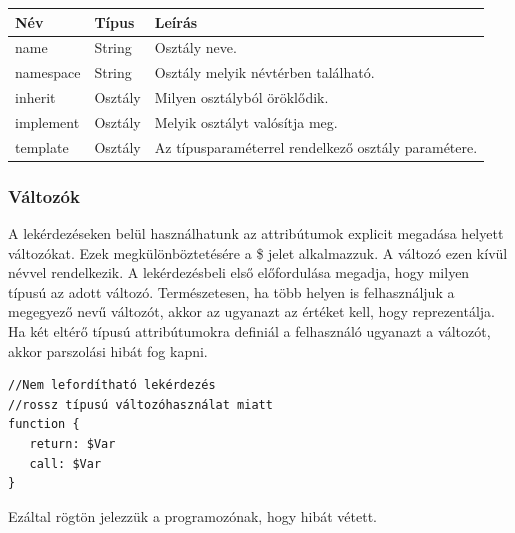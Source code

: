 \documentclass[a4paper,12pt]{report}
\begin{document}
\begin{center}
	\begin{tabular}{| l | l | l |}
		\hline
		Név & Típus & Leírás \\ \hline
		name & String & Osztály neve. \\ \hline
		namespace & String & Osztály melyik névtérben található. \\ \hline
		inherit & Osztály & Milyen osztályból öröklődik. \\ \hline
		implement & Osztály & Melyik osztályt valósítja meg. \\ \hline
		template & Osztály & Az típusparaméterrel rendelkező osztály paramétere. \\ \hline
	\end{tabular}
\end{center}
\subsubsection{Változók}
A lekérdezéseken belül használhatunk az attribútumok explicit megadása helyett változókat. Ezek megkülönböztetésére a \$ jelet alkalmazzuk. A változó ezen kívül névvel rendelkezik. A lekérdezésbeli első előfordulása megadja, hogy milyen típusú az adott változó. Természetesen, ha több helyen is felhasználjuk a megegyező nevű változót, akkor az ugyanazt az értéket kell, hogy reprezentálja. Ha két eltérő típusú attribútumokra definiál a felhasználó ugyanazt a változót, akkor parszolási hibát fog kapni.
\begin{verbatim}
//Nem lefordítható lekérdezés
//rossz típusú változóhasználat miatt
function {
   return: $Var
   call: $Var
}
\end{verbatim}
Ezáltal rögtön jelezzük a programozónak, hogy hibát vétett.
\end{document}

